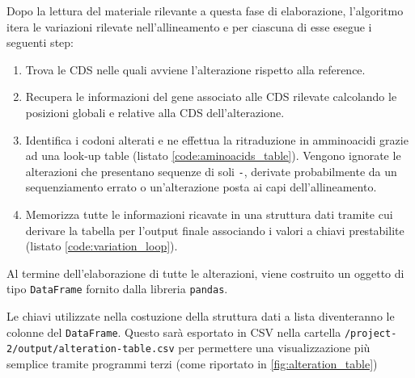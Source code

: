 \documentclass[11pt,italian]{article}
\begin{document}
\noindent
Dopo la lettura del materiale rilevante a questa fase di elaborazione, l'algoritmo itera le variazioni rilevate nell'allineamento e per ciascuna di esse esegue i seguenti step:
\begin{enumerate}
  \item Trova le CDS nelle quali avviene l'alterazione rispetto alla reference.
  \item Recupera le informazioni del gene associato alle CDS rilevate calcolando le posizioni globali e relative alla CDS dell'alterazione.
  \item Identifica i codoni alterati e ne effettua la ritraduzione in amminoacidi grazie ad una look-up table (listato \ref{code:aminoacids_table}). Vengono ignorate le alterazioni che presentano sequenze di soli \lstinline{-}, derivate probabilmente da un sequenziamento errato o un'alterazione posta ai capi dell'allineamento.
  \item Memorizza tutte le informazioni ricavate in una struttura dati tramite cui derivare la tabella per l'output finale associando i valori a chiavi prestabilite (listato \ref{code:variation_loop}).
\end{enumerate}

\noindent
Al termine dell'elaborazione di tutte le alterazioni, viene costruito un oggetto di tipo \lstinline{DataFrame} fornito dalla libreria \lstinline{pandas}.

Le chiavi utilizzate nella costuzione della struttura dati a lista diventeranno le colonne del \lstinline{DataFrame}. Questo sarà esportato in CSV nella cartella \lstinline{/project-2/output/alteration-table.csv} per permettere una visualizzazione più semplice tramite programmi terzi (come riportato in \cref{fig:alteration_table})

\newpage
\end{document}
